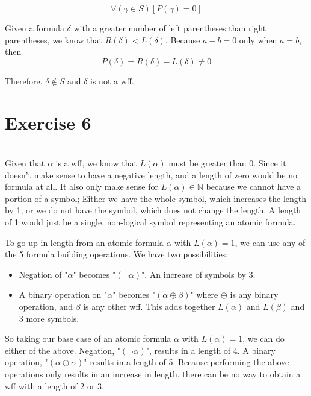 \documentclass[12pt]{article}
\begin{document}
\begin{equation}
    \forall (\gamma \in S) [P(\gamma)=0] 
\end{equation}

Given a formula $\delta$ with a greater number of left parentheses than right parentheses, we know that $R(\delta) < L(\delta)$. Because $a - b = 0$ only when $a = b$, then
\[P(\delta) = R(\delta) - L(\delta) \ne 0\]

Therefore, $\delta \notin S$ and $\delta$ is not a wff.


\newpage
\section*{Exercise 6}
\\

Given that $\alpha$ is a wff, we know that $L(\alpha)$ must be greater than 0. Since it doesn't make sense to have a negative length, and a length of zero would be no formula at all. It also only make sense for $L(\alpha) \in \mathbb{N}$ because we cannot have a portion of a symbol; Either we have the whole symbol, which increases the length by 1, or we do not have the symbol, which does not change the length. A length of 1 would just be a single, non-logical symbol representing an atomic formula. 

To go up in length from an atomic formula $\alpha$ with $L(\alpha) = 1$, we can use any of the 5 formula building operations. We have two possibilities:

\begin{itemize}
    \item Negation of "$\alpha$" becomes "$(\lnot \alpha)$". An increase of symbols by 3.
    \item A binary operation on "$\alpha$" becomes "$(\alpha \oplus \beta)$" where $\oplus$ is any binary operation, and $\beta$ is any other wff. This adds together $L(\alpha)$ and $L(\beta)$ and 3 more symbols.
\end{itemize}

So taking our base case of an atomic formula $\alpha$ with $L(\alpha) = 1$, we can do either of the above. Negation, "$(\lnot \alpha)$", results in a length of 4. A binary operation, "$(\alpha \oplus \alpha)$" results in a length of 5. Because performing the above operations only results in an increase in length, there can be no way to obtain a wff with a length of 2 or 3. 
\end{document}
